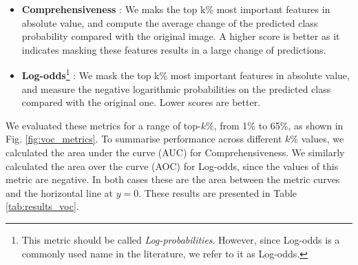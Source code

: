 \begin{itemize}
    \item \textbf{Comprehensiveness} \citep{deyoung2019eraser}: We maks the top k\% most important features in absolute value, and compute the average change of the predicted class probability compared with the original image. A higher score is better as it indicates masking these features results in a large change of predictions.

    \item \textbf{Log-odds}\footnote{This metric should be called \emph{Log-probabilities}. However, since Log-odds is a commonly used name in the literature, we refer to it as Log-odds.} \citep{shrikumar2017learning}: We mask the top k\% most important features in absolute value, and measure the negative logarithmic probabilities on the predicted class compared with the original one. Lower scores are better.
\end{itemize}

\begin{table}[t]
	\centering
	\caption{Evaluation of different attribution methods on 100 randomly sampled images from the Pascal VOC test set. Fig. \ref{fig:voc_metrics} shows the curves where these metrics are extracted from.}
	\label{tab:results_voc}
\end{table}


We evaluated these metrics for a range of top-$k\%$, from 1\% to 65\%, as shown in Fig. \ref{fig:voc_metrics}. To summarise performance across different $k\%$ values, we calculated the area under the curve (AUC) for Comprehensiveness. We similarly calculated the area over the curve (AOC) for Log-odds, since the values of this metric are negative. In both cases these are the area between the metric curves and the horizontal line at $y=0$. These results are presented in Table \ref{tab:results_voc}.

